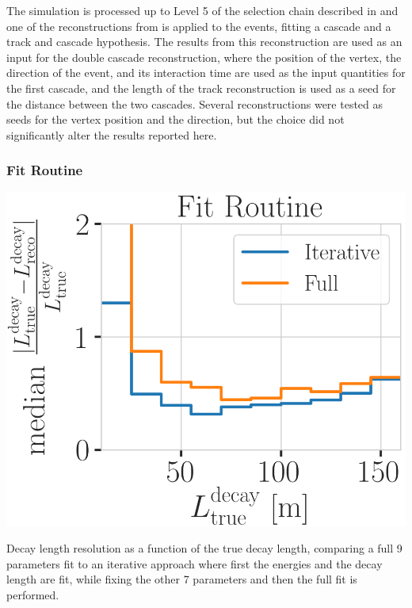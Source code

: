 The simulation is processed up to Level 5 of the selection chain described in  and one of the reconstructions from  is applied to the events, fitting a cascade and a track and cascade hypothesis. The results from this reconstruction are used as an input for the double cascade reconstruction, where the position of the vertex, the direction of the event, and its interaction time are used as the input quantities for the first cascade, and the length of the track reconstruction is used as a seed for the distance between the two cascades. Several reconstructions were tested as seeds for the vertex position and the direction, but the choice did not significantly alter the results reported here.


\subsubsection{Fit Routine}

\begin{marginfigure}
	\centering
    \includegraphics{figures/results/190605_reco_optimization/fit_routine_splitting_median_decay_length_resolution_Good + L7 + reco E1,E2 above 3_fix_y_new.png}
    \caption[Decay length resolution to optimize fit routine]{Decay length resolution as a function of the true decay length, comparing a full 9 parameters fit to an iterative approach where first the energies and the decay length are fit, while fixing the other 7 parameters and then the full fit is performed.}
\end{marginfigure}

